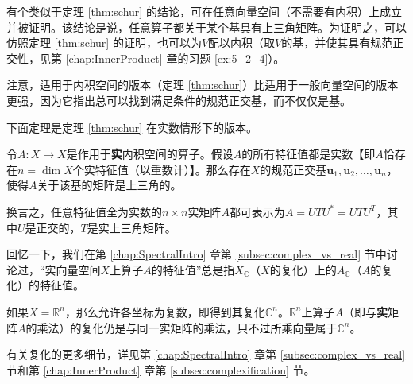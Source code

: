 \begin{remark*}
    有个类似于定理 \ref{thm:schur} 的结论，可在任意向量空间（不需要有内积）上成立并被证明。该结论是说，任意算子都关于某个基具有上三角矩阵。为证明之，可以仿照定理 \ref{thm:schur} 的证明，也可以为$V$配以内积（取$V$的基，并使其具有规范正交性，见第 \ref{chap:InnerProduct} 章的习题 \ref{ex:5_2_4}）。

    注意，适用于内积空间的版本（定理 \ref{thm:schur}）比适用于一般向量空间的版本更强，因为它指出总可以找到满足条件的规范正交基，而不仅仅是基。
\end{remark*}

下面定理是定理 \ref{thm:schur} 在实数情形下的版本。

\begin{theorem}\label{thm:schur_real}
    令$A:X\to X$是作用于{\bf 实}内积空间的算子。假设$A$的所有特征值都是实数【即$A$恰存在$n=\dim X$个实特征值（以重数计）】。那么存在$X$的规范正交基$\mathbf{u}_{1},\mathbf{u}_{2},\ldots,\mathbf{u}_{n}$，使得$A$关于该基的矩阵是上三角的。

    换言之，任意特征值全为实数的$n\times n$实矩阵$A$都可表示为$A=UTU^*=UTU^T$，其中$U$是正交的，$T$是实上三角矩阵。
\end{theorem}

\begin{remark}\label{remark:eig_complex}
    回忆一下，我们在第 \ref{chap:SpectralIntro} 章第 \ref{subsec:complex_vs_real} 节中讨论过，“实向量空间$X$上算子$A$的特征值”总是指$X_\mathbb{C}$（$X$的复化）上的$A_\mathbb{C}$（$A$的复化）的特征值。

    如果$X=\mathbb{R}^n$，那么允许各坐标为复数，即得到其复化$\mathbb{C}^n$。$\mathbb{R}^n$上算子$A$（即与{\bf 实}矩阵$A$的乘法）的复化仍是与同一实矩阵的乘法，只不过所乘向量属于$\mathbb{C}^n$。

    有关复化的更多细节，详见第 \ref{chap:SpectralIntro} 章第 \ref{subsec:complex_vs_real} 节和第 \ref{chap:InnerProduct} 章第 \ref{subsec:complexification} 节。
\end{remark}

